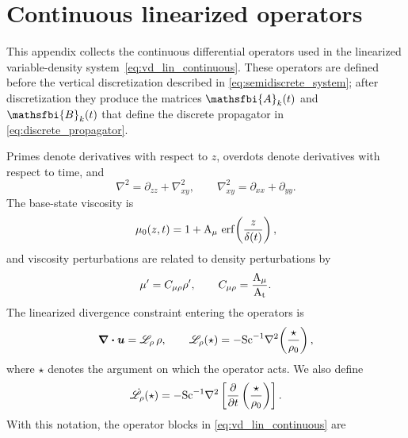 \section{Continuous linearized operators}
\label{app:operators}

This appendix collects the continuous differential operators used in the linearized
variable-density system~\eqref{eq:vd_lin_continuous}. These operators are defined
before the vertical discretization described in \eqref{eq:semidiscrete_system}; after
discretization they produce the matrices \(\mathsfbi{A}_{k}(t)\) and \(\mathsfbi{B}_{k}(t)\) that
define the discrete propagator in \eqref{eq:discrete_propagator}.

Primes denote derivatives with respect to \(z\), overdots denote derivatives with respect to time,
and
\begin{equation}
  \nabla^2=\partial_{zz}+\nabla_{xy}^2,
  \qquad
  \nabla_{xy}^2=\partial_{xx}+\partial_{yy}.
  \label{eq:appendix_laplacian_definitions}
\end{equation}
The base-state viscosity is
\begin{equation}
  \mu_0(z,t)
  =
  1+\mathrm{A}_{\mu}\,\operatorname{erf}\!\left(\frac{z}{\delta(t)}\right),
  \label{eq:appendix_base_viscosity}
\end{equation}
and viscosity perturbations are related to density perturbations by
\begin{equation}
  \mu' = C_{\mu\rho}\rho',
  \qquad
  C_{\mu\rho}=\frac{\mathrm{A}_{\mu}}{\mathrm{A_t}}.
  \label{eq:appendix_viscosity_density_coupling}
\end{equation}
The linearized divergence constraint entering the operators is
\begin{equation}
  \boldsymbol{\nabla}\boldsymbol{\cdot}\boldsymbol{u}
  =
  \mathscr{L}_{\rho}\,\rho,
  \qquad
  \mathscr{L}_{\rho}(\star)
  =
  -\mathrm{Sc}^{-1}\nabla^2\!\left(\frac{\star}{\rho_0}\right),
  \label{eq:linearized_divergence}
\end{equation}
where \(\star\) denotes the argument on which the operator acts. We also define
\begin{equation}
  \dot{\mathscr{L}}_{\rho}(\star)
  =
  -\mathrm{Sc}^{-1}
  \nabla^2
  \left[
    \frac{\partial}{\partial t}
    \left(
      \frac{\star}{\rho_0}
    \right)
  \right].
  \label{eq:ldot_rho}
\end{equation}
With this notation, the operator blocks in \eqref{eq:vd_lin_continuous} are
